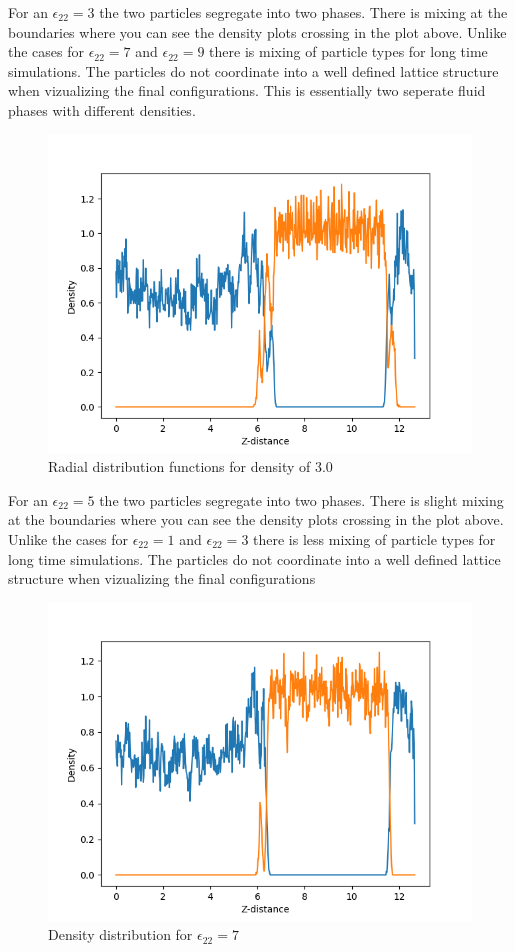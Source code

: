 \documentclass{article}
\begin{document}
		For an  $\epsilon _{22}=3$ the two particles segregate into two phases. There is mixing at the boundaries where you can see the density plots crossing in the plot above. Unlike the cases for $\epsilon _{22}=7$ and $\epsilon _{22}=9$ there is mixing of particle types for long time simulations. The particles do not coordinate into a well defined lattice structure when vizualizing the final configurations. This is essentially two seperate fluid phases with different densities.


		\begin{figure}[H]
				\centering
				\includegraphics[scale=0.5]{dens_eps5}
				\caption{Radial distribution functions for density of 3.0}
		\end{figure}

		For an  $\epsilon _{22}=5$ the two particles segregate into two phases. There is slight mixing at the boundaries where you can see the density plots crossing in the plot above. Unlike the cases for $\epsilon _{22}=1$ and $\epsilon _{22}=3$ there is less mixing of particle types for long time simulations. The particles do not coordinate into a well defined lattice structure when vizualizing the final configurations


		\begin{figure}[H]
				\centering
				\includegraphics[scale=0.5]{dens_eps7}
				\caption{Density distribution for $\epsilon _{22} = 7$}
		\end{figure}
\end{document}
